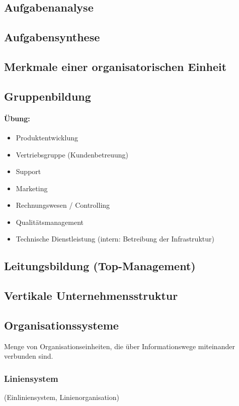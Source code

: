 \documentclass{scrreprt}
\begin{document}
\subsection{Aufgabenanalyse}
\subsection{Aufgabensynthese}
\subsection{Merkmale einer organisatorischen Einheit}
\subsection{Gruppenbildung}
\paragraph{Übung:}
\begin{itemize}
\item Produktentwicklung
\item Vertriebsgruppe (Kundenbetreuung)
\item Support
\item Marketing
\item Rechnungswesen / Controlling
\item Qualitätsmanagement
\item Technische Dienstleistung (intern: Betreibung der Infrastruktur)
\end{itemize}
\subsection{Leitungsbildung (Top-Management)}
\subsection{Vertikale Unternehmensstruktur}
\subsection{Organisationssysteme}
Menge von Organisationseinheiten, die über Informationswege miteinander verbunden sind.
\subsubsection{Liniensystem}
(Einliniensystem, Linienorganisation)
\end{document}
